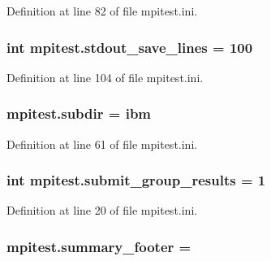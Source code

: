 Definition at line 82 of file mpitest.\-ini.

\hypertarget{namespacempitest_a4a75d79ba591224da573cc9ab62552b6}{
\subsubsection[{stdout\-\_\-save\-\_\-lines}]{\setlength{\rightskip}{0pt plus 5cm}int mpitest.\-stdout\-\_\-save\-\_\-lines = 100}}\label{namespacempitest_a4a75d79ba591224da573cc9ab62552b6}


Definition at line 104 of file mpitest.\-ini.

\hypertarget{namespacempitest_adb11b85868ea4bb66346873247ae5eee}{
\subsubsection[{subdir}]{\setlength{\rightskip}{0pt plus 5cm}mpitest.\-subdir = ibm}}\label{namespacempitest_adb11b85868ea4bb66346873247ae5eee}


Definition at line 61 of file mpitest.\-ini.

\hypertarget{namespacempitest_ac471d6a27e0973ff2ca6b08b1709963d}{
\subsubsection[{submit\-\_\-group\-\_\-results}]{\setlength{\rightskip}{0pt plus 5cm}int mpitest.\-submit\-\_\-group\-\_\-results = 1}}\label{namespacempitest_ac471d6a27e0973ff2ca6b08b1709963d}


Definition at line 20 of file mpitest.\-ini.

\hypertarget{namespacempitest_a982b2dded1406d02564695cb5e756197}{
\subsubsection[{summary\-\_\-footer}]{\setlength{\rightskip}{0pt plus 5cm}mpitest.\-summary\-\_\-footer =}}\label{namespacempitest_a982b2dded1406d02564695cb5e756197}



